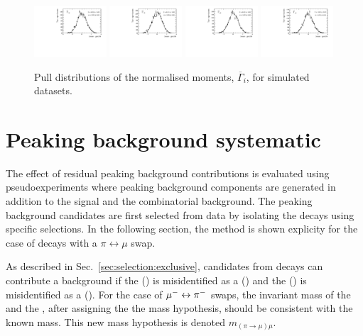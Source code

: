 \begin{figure}
\includegraphics[width=0.24\textwidth]{figs/kpimm/angular-analysis/toys/pull_m_38.pdf}
\includegraphics[width=0.24\textwidth]{figs/kpimm/angular-analysis/toys/pull_m_39.pdf}
\includegraphics[width=0.24\textwidth]{figs/kpimm/angular-analysis/toys/pull_m_40.pdf}
\includegraphics[width=0.24\textwidth]{figs/kpimm/angular-analysis/toys/pull_m_41.pdf}
\caption{Pull distributions of the normalised moments, $\overline{\Gamma}_{i}$, for simulated datasets.}
\label{fig:appendix:kpimm:angular-analysis:toys:pulls:2}
\end{figure}

\clearpage
\section{Peaking background systematic}
\label{sec:appendix:kernel}

The effect of residual peaking background contributions is evaluated using pseudoexperiments where peaking background components are generated in addition to the signal and the combinatorial background. The peaking background candidates are first selected from data by isolating the decays using specific selections. In the following section, the method is shown explicity for the case of \BdToJPsiKpi decays with a $\pi\leftrightarrow\mu$ swap. 

As described in Sec.~\ref{sec:selection:exclusive}, candidates from \BdToJPsiKpi decays can contribute a background if the \pim (\Kp) is misidentified as a \mun (\mup) and the \mun (\mup) is misidentified as a \pim (\Kp).  For the case of ${\mu^-} \leftrightarrow {\ensuremath{{\pi}^-}}$ swaps, the invariant mass of the \pim and the \mup, after assigning the \pim the \muon mass hypothesis, should be consistent with the known \jpsi mass. This new mass hypothesis is denoted $m_{(\pi\to\mu)\mu}$.

